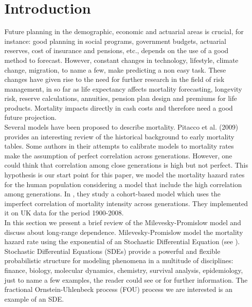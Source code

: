 \documentclass[smallextended]{svjour3}
\begin{document}
\section{Introduction}
\label{intro}

Future planning in the demographic, economic and actuarial areas is crucial, 
for instance: good planning in
social programs, government budgets, actuarial reserves, cost of insurance and 
pensions, etc.,
depends on the use of a good method to forecast. However,  constant changes in 
technology,
lifestyle, climate change, migration, to name a few, make  predicting  a non 
easy task. These changes
have given rise to the need for further research in the  field of risk 
management, in so far as life expectancy affects mortality
forecasting, longevity risk, reserve calculations, annuities, pension plan 
design and premiums for life products.
Mortality  impacts directly in  cash costs and therefore need a good future 
projection. \\



Several models have been proposed to describe mortality. Pitacco et al. (2009) 
provides an interesting review of the
historical background to early mortality tables. Some authors in their attempts 
to calibrate models to mortality rates
make the assumption of perfect correlation across generations. However, one 
could think that correlation among close generations is
high but not perfect. This hypothesis is
our start point for this paper, we model the mortality hazard rates for the 
human population considering a
model that include the high correlation among generations.
In \cite{je-lu-vi}, they study a cohort-based model which uses the imperfect 
correlation of mortality intensity
across generations. They implemented  it on UK data for the period 1900-2008.\\


In this section we present a brief review of the Milevesky-Promislow model and  
discuss about long-range dependence.
Milevesky-Promislow model the mortality hazard rate using the
exponential of an Stochastic Differential Equation (see \cite{mi-pr}).  \\

Stochastic Differential Equations (SDEs) provide a powerful and flexible 
probabilistic structure for modeling phenomena in a
multitude of disciplines: finance, biology, molecular dynamics, chemistry, 
survival analysis, epidemiology, just to name a few
examples, the reader could see \cite{ok} or \cite{kl-pl} for further 
information. The fractional Ornstein-Uhlenbeck process
(FOU) process we are interested is an example of an SDE.\\
\end{document}
